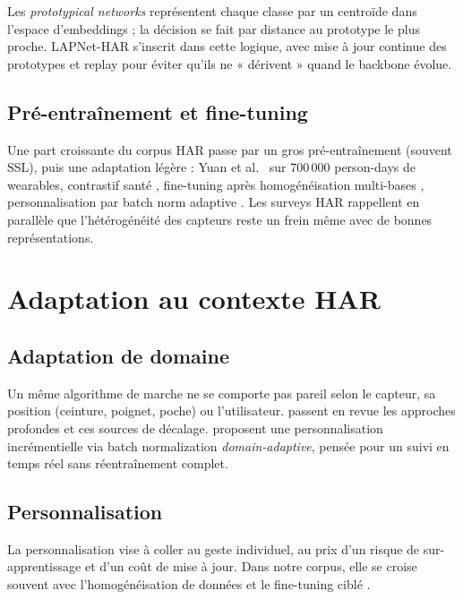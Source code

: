 \documentclass[a4paper,12pt]{report}
\begin{document}
Les \emph{prototypical networks} représentent chaque classe par un centroïde
dans l'espace d'embeddings ; la décision se fait par distance au prototype le
plus proche. LAPNet-HAR \parencite{adaimi2022} s'inscrit dans cette logique,
avec mise à jour continue des prototypes et replay pour éviter qu'ils ne
« dérivent » quand le backbone évolue.

\subsection{Pré-entraînement et fine-tuning}

Une part croissante du corpus HAR passe par un gros pré-entraînement (souvent
SSL), puis une adaptation légère : Yuan et al.\ \parencite{yuan2024} sur
700\,000 person-days de wearables, contrastif santé \parencite{tang2021},
fine-tuning après homogénéisation multi-bases \parencite{amrani2025},
personnalisation par batch norm adaptive \parencite{mazankiewicz2020}. Les
surveys HAR \parencite{wang2019,gu2021} rappellent en parallèle que
l'hétérogénéité des capteurs reste un frein même avec de bonnes
représentations.

\section{Adaptation au contexte HAR}

\subsection{Adaptation de domaine}

Un même algorithme de marche ne se comporte pas pareil selon le capteur, sa
position (ceinture, poignet, poche) ou l'utilisateur. \textcite{gu2021,wang2019}
passent en revue les approches profondes et ces sources de décalage.
\textcite{mazankiewicz2020} proposent une personnalisation incrémentielle via
batch normalization \emph{domain-adaptive}, pensée pour un suivi en temps réel
sans réentraînement complet.

\subsection{Personnalisation}

La personnalisation vise à coller au geste individuel, au prix d'un risque de
sur-apprentissage et d'un coût de mise à jour. Dans notre corpus, elle se
croise souvent avec l'homogénéisation de données et le fine-tuning ciblé
\parencite{amrani2025,mazankiewicz2020}.
\end{document}
